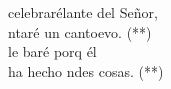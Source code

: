 \begin{cancion}[Yo celebraré][]%
	celebrarélante del Señor,\\
	ntaré un cantoevo. (**)\\
\jump
	le baré porq él \\
	ha hecho ndes cosas. (**)\\
\end{cancion}%
